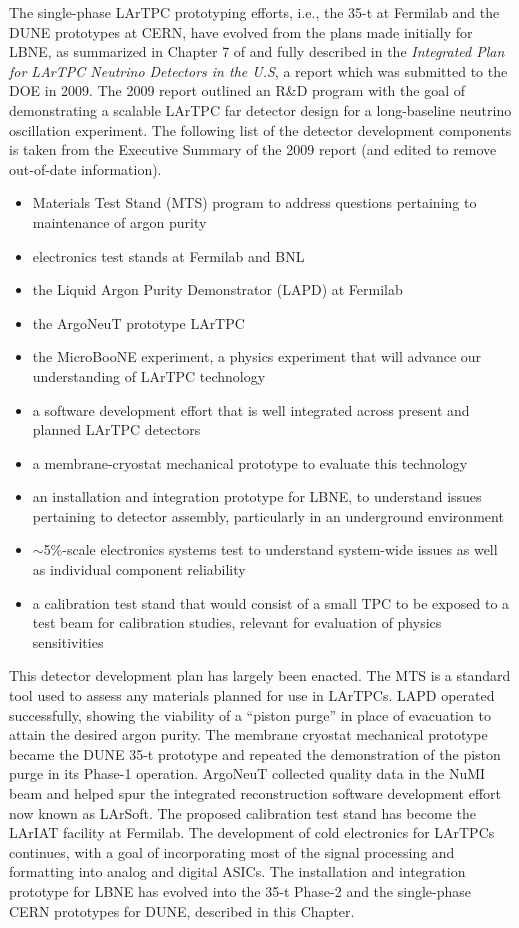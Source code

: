 The single-phase LArTPC prototyping efforts, i.e., the 35-t at
Fermilab and the DUNE prototypes at CERN, have evolved from the plans
made initially for LBNE, as summarized in Chapter 7 of \anxlbnefd{}
and fully described in the \textit{Integrated Plan for LArTPC Neutrino
  Detectors in the U.S}, a report which was submitted to the DOE in
2009.  The 2009 report outlined an R\&D program with the goal of
demonstrating a scalable LArTPC far detector design for a
long-baseline neutrino oscillation experiment.  The following list of
the detector development components is taken from the Executive
Summary of the 2009 report (and edited to remove out-of-date
information).
\begin{itemize}
   \item Materials Test Stand (MTS) program 
   to address questions pertaining to maintenance of argon purity
    \item electronics test stands at Fermilab and BNL
    \item the Liquid Argon Purity Demonstrator (LAPD) at Fermilab
    \item the ArgoNeuT prototype LArTPC 
    \item the MicroBooNE experiment, a physics experiment that will
      advance our understanding of LArTPC technology
    \item a software development effort that is well integrated across
      present and planned LArTPC detectors
    \item a membrane-cryostat mechanical prototype to evaluate this technology
    \item an installation and integration prototype for LBNE, to
      understand issues pertaining to detector assembly, particularly
      in an underground environment
    \item $\sim$5\%-scale electronics systems test to understand
      system-wide issues as well as individual component reliability
    \item a calibration test stand that would consist of a small TPC
      to be exposed to a test beam for calibration studies, relevant
      for evaluation of physics sensitivities
\end{itemize}

This detector development plan has largely been enacted.  The MTS is a
standard tool used to assess any materials planned for use in LArTPCs.
LAPD operated successfully, showing the viability of a ``piston purge'' in
place of evacuation to attain the desired argon purity.  The membrane
cryostat mechanical prototype became the DUNE 35-t prototype and
repeated the demonstration of the piston purge in its Phase-1
operation.  ArgoNeuT collected quality data in the NuMI beam and
helped spur the integrated reconstruction software development effort
now known as LArSoft.  The proposed calibration test stand has become
the LArIAT facility at Fermilab.  The development of cold electronics
for LArTPCs continues, with a goal of incorporating most of the signal
processing and formatting into analog and digital ASICs.  The
installation and integration prototype for LBNE has evolved into the
35-t Phase-2 and the single-phase CERN prototypes for DUNE, described
in this Chapter.
 
